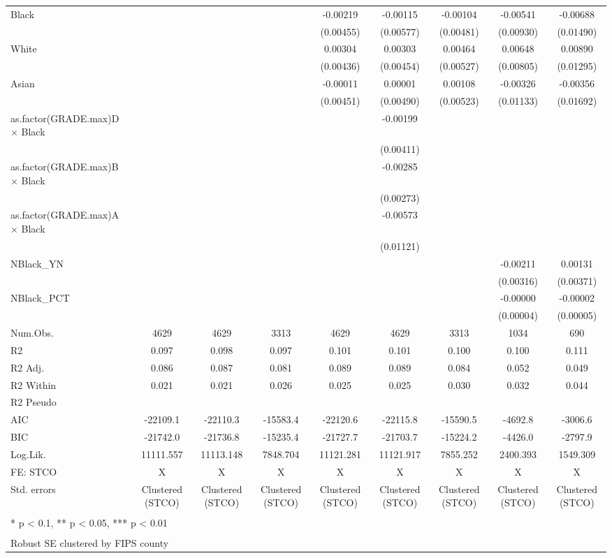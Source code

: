 \documentclass[
]{article}
\begin{document}
\begin{table}[H]
\begin{table}[H]
{\begin{tabular}[t]{lcccccccc}
Black &  &  &  & -0.00219 & -0.00115 & -0.00104 & -0.00541 & -0.00688\\
 &  &  &  & (0.00455) & (0.00577) & (0.00481) & (0.00930) & (0.01490)\\
White &  &  &  & 0.00304 & 0.00303 & 0.00464 & 0.00648 & 0.00890\\
 &  &  &  & (0.00436) & (0.00454) & (0.00527) & (0.00805) & (0.01295)\\
Asian &  &  &  & -0.00011 & 0.00001 & 0.00108 & -0.00326 & -0.00356\\
 &  &  &  & (0.00451) & (0.00490) & (0.00523) & (0.01133) & (0.01692)\\
as.factor(GRADE.max)D × Black &  &  &  &  & -0.00199 &  &  & \\
 &  &  &  &  & (0.00411) &  &  & \\
as.factor(GRADE.max)B × Black &  &  &  &  & -0.00285 &  &  & \\
 &  &  &  &  & (0.00273) &  &  & \\
as.factor(GRADE.max)A × Black &  &  &  &  & -0.00573 &  &  & \\
 &  &  &  &  & (0.01121) &  &  & \\
NBlack\_YN &  &  &  &  &  &  & -0.00211 & 0.00131\\
 &  &  &  &  &  &  & (0.00316) & (0.00371)\\
NBlack\_PCT &  &  &  &  &  &  & -0.00000 & -0.00002\\
 &  &  &  &  &  &  & (0.00004) & (0.00005)\\
\midrule
Num.Obs. & 4629 & 4629 & 3313 & 4629 & 4629 & 3313 & 1034 & 690\\
R2 & 0.097 & 0.098 & 0.097 & 0.101 & 0.101 & 0.100 & 0.100 & 0.111\\
R2 Adj. & 0.086 & 0.087 & 0.081 & 0.089 & 0.089 & 0.084 & 0.052 & 0.049\\
R2 Within & 0.021 & 0.021 & 0.026 & 0.025 & 0.025 & 0.030 & 0.032 & 0.044\\
R2 Pseudo &  &  &  &  &  &  &  & \\
AIC & -22109.1 & -22110.3 & -15583.4 & -22120.6 & -22115.8 & -15590.5 & -4692.8 & -3006.6\\
BIC & -21742.0 & -21736.8 & -15235.4 & -21727.7 & -21703.7 & -15224.2 & -4426.0 & -2797.9\\
Log.Lik. & 11111.557 & 11113.148 & 7848.704 & 11121.281 & 11121.917 & 7855.252 & 2400.393 & 1549.309\\
FE: STCO & X & X & X & X & X & X & X & X\\
Std. errors & Clustered (STCO) & Clustered (STCO) & Clustered (STCO) & Clustered (STCO) & Clustered (STCO) & Clustered (STCO) & Clustered (STCO) & Clustered (STCO)\\
\bottomrule
\multicolumn{9}{l}{\textsuperscript{} * p < 0.1, ** p < 0.05, *** p < 0.01}\\
\multicolumn{9}{l}{\textsuperscript{} Robust SE clustered by FIPS county}\\
\end{tabular}}
\end{table}
\end{table}
\end{document}
